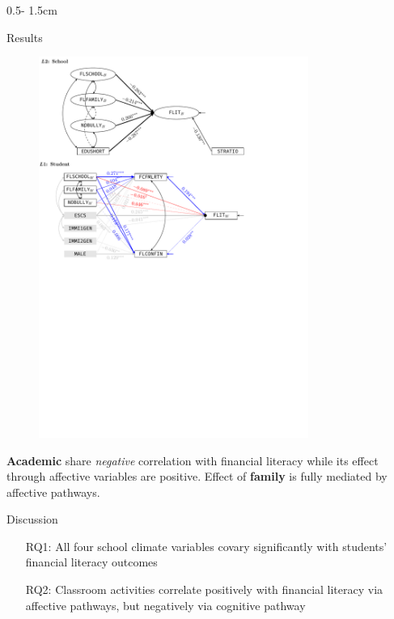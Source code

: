 \documentclass{uioposter}
\begin{document}
\begin{frame}
\begin{columns}[onlytextwidth]
\begin{column}{0.5\textwidth - 1.5cm}
    \begin{block}{Results}
        \vspace{-1.2cm}
        \begin{figure}
            \includegraphics[width=0.785\textwidth]{../Figures/Poster_result.pdf}
        \end{figure}
        \vspace{-0.6cm}

    \textbf{Academic} share \emph{negative} correlation with financial literacy while its effect through affective variables are positive. Effect of \textbf{family} is fully mediated by affective pathways.
    \end{block}

    \begin{block}{Discussion}
        \begin{enumerate}
            \item[RQ1:] All four school climate variables covary significantly with students' financial literacy outcomes
            \item[RQ2:] Classroom activities correlate positively with financial literacy via affective pathways, but negatively via cognitive pathway
        \end{enumerate}


\end{block}
\end{column}
\end{columns}
\end{frame}
\end{document}
